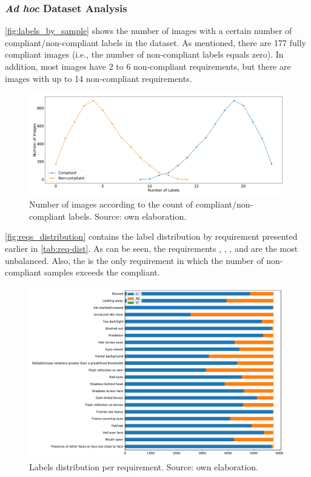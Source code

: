 \subsubsection{\textit{Ad hoc} Dataset Analysis}
 
\autoref{fig:labels_by_sample} shows the number of images with a certain number of compliant/non-compliant labels in the \adhoc dataset. As mentioned, there are 177 fully compliant images (i.e., the number of non-compliant labels equals zero). In addition, most images have 2 to 6 non-compliant requirements, but there are images with up to 14 non-compliant requirements.
 
\begin{figure}[tb]
\centering
\includegraphics[width=\linewidth]{images/dataset/labels_by_sample.pdf}
\caption{Number of images according to the count of compliant/non-compliant labels. Source: own elaboration.}
\label{fig:labels_by_sample}
\end{figure}
 
\autoref{fig:reqs_distribution} contains the label distribution by requirement presented earlier in \autoref{tab:req-dist}. As can be seen, the requirements \inkmarked, \washedout, \framestooheavy, and \otherfacesortoys are the most unbalanced. Also, the \unnaturalskintone is the only requirement in which the number of non-compliant samples exceeds the compliant.
 
\begin{figure}[tb]
\centering
\includegraphics[width=\linewidth]{images/reqs/reqs_distribution.pdf}
\caption{Labels distribution per requirement. Source: own elaboration.}
\label{fig:reqs_distribution}
\end{figure}
 
